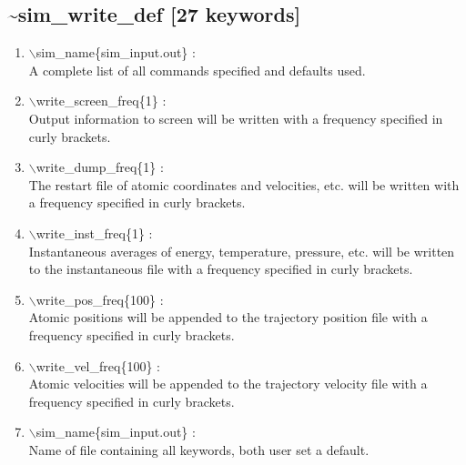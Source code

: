 \documentclass[12pt,titlepage]{article}
\begin{document}
\subsection*{\bf \~{}sim\_write\_def [27 keywords]}
\begin{enumerate}

 \vspace{0.15in} 
 \item   $\backslash$sim\_name\{sim\_input.out\} : \\
    A complete list of all commands specified and defaults used.

 \vspace{0.15in} 
 \item   $\backslash$write\_screen\_freq\{1\} : \\
   Output information to screen will be written with a frequency specified
   in curly brackets.

 \vspace{0.15in} 
 \item   $\backslash$write\_dump\_freq\{1\} : \\
     The restart file of atomic coordinates and velocities, etc. will be
     written with a frequency specified in curly brackets.

 \vspace{0.15in}
 \item   $\backslash$write\_inst\_freq\{1\} : \\
     Instantaneous averages of energy, temperature, pressure, etc. will be 
     written to the instantaneous file with a frequency specified in curly 
     brackets.

 \vspace{0.15in} 
 \item   $\backslash$write\_pos\_freq\{100\} : \\
    Atomic positions will be appended to the trajectory position file with
    a frequency specified in curly brackets.

 \vspace{0.15in} 
 \item   $\backslash$write\_vel\_freq\{100\} : \\
    Atomic velocities will be appended to the trajectory velocity file with
    a frequency specified in curly brackets.

 \vspace{0.15in} 
 \item   $\backslash$sim\_name\{sim\_input.out\} : \\
     Name of file containing all keywords, both user set a default.


\end{enumerate}
\end{document}

